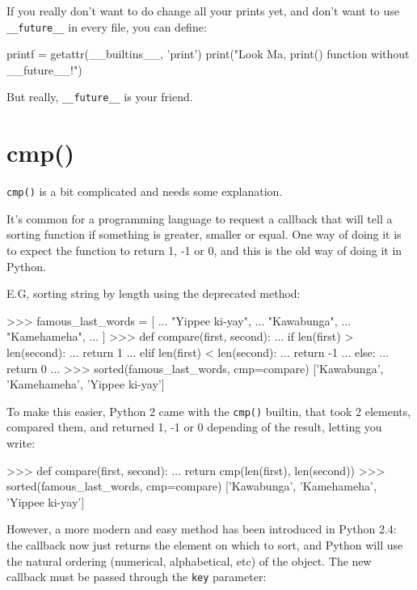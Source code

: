 If you really don't want to do change all your prints yet, and don't want to use \lstinline{__future__} in every file, you can define:

\begin{py2and3}
printf = getattr(__builtins__, 'print')
print("Look Ma, print() function without __future__!")
\end{py2and3}

But really, \lstinline{__future__} is your friend.


\section{cmp()}

\lstinline{cmp()} is a bit complicated and needs some explanation.

It's common for a programming language to request a callback that will tell a sorting function if something is greater, smaller or equal. One way of doing it is to expect the function to return 1, -1 or 0, and this is the old way of doing it in Python.

E.G, sorting string by length using the deprecated method:

\begin{py2}
>>> famous_last_words = [
...     "Yippee ki-yay",
...     "Kawabunga",
...     "Kamehameha",
... ]
>>> def compare(first, second):
...     if len(first) > len(second):
...         return 1
...     elif len(first) < len(second):
...         return -1
...     else:
...         return 0
...
>>> sorted(famous_last_words, cmp=compare)
['Kawabunga', 'Kamehameha', 'Yippee ki-yay']
\end{py2}

To make this easier, Python 2 came with the \lstinline{cmp()} builtin, that took 2 elements, compared them, and returned 1, -1 or 0 depending of the result, letting you write:

\begin{py2}
>>> def compare(first, second):
...     return cmp(len(first), len(second))
>>> sorted(famous_last_words, cmp=compare)
['Kawabunga', 'Kamehameha', 'Yippee ki-yay']
\end{py2}

However, a more modern and easy method has been introduced in Python 2.4: the callback now just returns the element on which to sort, and Python will use the natural ordering (numerical, alphabetical, etc) of the object. The new callback must be passed through the \lstinline{key} parameter:

